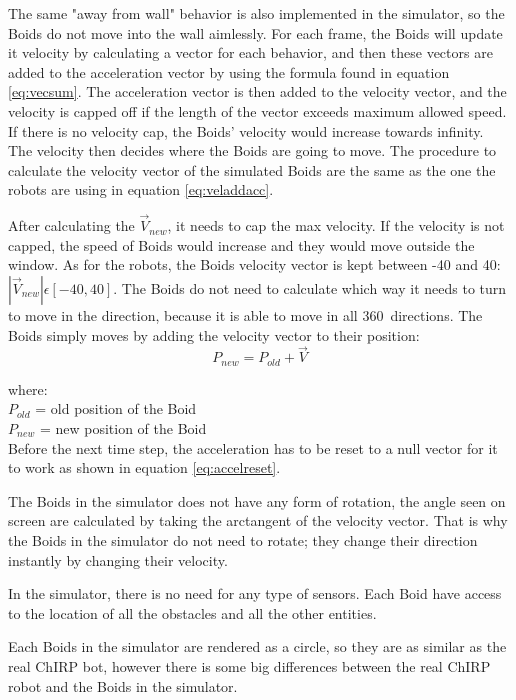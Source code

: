 The same "away from wall" behavior is also implemented in the simulator, so the Boids do not move into the wall aimlessly.
For each frame, the Boids will update it velocity by calculating a vector for each behavior, and then these vectors are added to the acceleration vector by using the formula found in equation \ref{eq:vecsum}. The acceleration vector is then added to the velocity vector, and the velocity is capped off if the length of the vector exceeds maximum allowed speed. If there is no velocity cap, the Boids' velocity would increase towards infinity. The velocity then decides where the Boids are going to move.
The procedure to calculate the velocity vector of the simulated Boids are the same as the one the robots are using in equation \ref{eq:veladdacc}. 

After calculating the $\vec{V}_{new}$, it needs to cap the max velocity. If the velocity is not capped, the speed of Boids would increase and they would move outside the window. As for the robots, the Boids velocity vector is kept between -40 and 40:  $|\vec{V}_{new}| \epsilon [-40,40]$.
The Boids do not need to calculate which way it needs to turn to move in the direction, because it is able to move in all 360\textdegree\ directions.
The Boids simply moves by adding the velocity vector to their position:
\begin{equation}
\label{eq:posadd}
P_{new} = P_{old} + \vec{V}
\end{equation}

where:\\
$P_{old}$ = old position of the Boid\\
$P_{new}$ = new position of the Boid\\

Before the next time step, the acceleration has to be reset to a null vector for it to work as shown in equation \ref{eq:accelreset}.

The Boids in the simulator does not have any form of rotation, the angle seen on screen are calculated by taking the arctangent of the velocity vector. That is why the Boids in the simulator do not need to rotate; they change their direction instantly by changing their velocity.

In the simulator, there is no need for any type of sensors. Each Boid have access to the location of all the obstacles and all the other entities.

Each Boids in the simulator are rendered as a circle, so they are as similar as the real ChIRP bot, however there is some big differences between the real ChIRP robot and the Boids in the simulator. 

